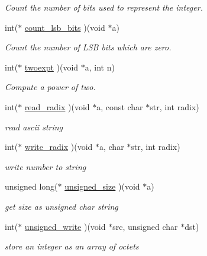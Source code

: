 \begin{DoxyCompactItemize}
\begin{DoxyCompactList}\small\item\em Count the number of bits used to represent the integer. \end{DoxyCompactList}\item 
int($\ast$ \mbox{\hyperlink{structltc__math__descriptor_a35b5d101c179e6504397fd7bb9dab0d7}{count\+\_\+lsb\+\_\+bits}} )(void $\ast$a)
\begin{DoxyCompactList}\small\item\em Count the number of L\+SB bits which are zero. \end{DoxyCompactList}\item 
int($\ast$ \mbox{\hyperlink{structltc__math__descriptor_a2c95a128028d91f98692e75e2349bddc}{twoexpt}} )(void $\ast$a, int n)
\begin{DoxyCompactList}\small\item\em Compute a power of two. \end{DoxyCompactList}\item 
int($\ast$ \mbox{\hyperlink{structltc__math__descriptor_afb032eeb403a00f981461b23f8b95588}{read\+\_\+radix}} )(void $\ast$a, const char $\ast$str, int radix)
\begin{DoxyCompactList}\small\item\em read ascii string \end{DoxyCompactList}\item 
int($\ast$ \mbox{\hyperlink{structltc__math__descriptor_a2e15b6390426a57dad267e123d50f317}{write\+\_\+radix}} )(void $\ast$a, char $\ast$str, int radix)
\begin{DoxyCompactList}\small\item\em write number to string \end{DoxyCompactList}\item 
unsigned long($\ast$ \mbox{\hyperlink{structltc__math__descriptor_ad00aec091ffab4884b7eb4e826f7e5b0}{unsigned\+\_\+size}} )(void $\ast$a)
\begin{DoxyCompactList}\small\item\em get size as unsigned char string \end{DoxyCompactList}\item 
int($\ast$ \mbox{\hyperlink{structltc__math__descriptor_adad74e32ded1d53e400ff3816d0dd029}{unsigned\+\_\+write}} )(void $\ast$src, unsigned char $\ast$dst)
\begin{DoxyCompactList}\small\item\em store an integer as an array of octets \end{DoxyCompactList}\item 

\end{DoxyCompactItemize}
